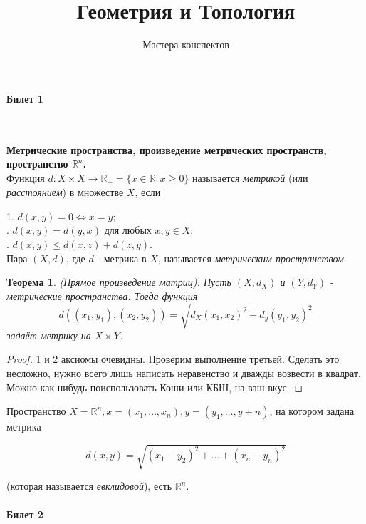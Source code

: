 \documentclass[a4paper,100pt]{article}
\title{Геометрия и Топология}
\author{Мастера конспектов}
\theoremstyle{indented}
\newtheorem{theorem}{Теорема}
\begin{document}
\maketitle 

\newpage

\paragraph{Билет 1} \

\medskip

\textbf{Метрические пространства, произведение метрических пространств, пространство $\mathbb{R}^n$.} \\

Функция $d: X \times X \rightarrow \mathbb{R}_+ = \{x \in \mathbb{R} : x\geq 0\}$ называется \textit{метрикой} (или \textit{расстоянием}) 
в множестве $X$, если \

\medskip

1. $d(x, y)=0 \Leftrightarrow x=y$; \\
. $d(x, y)= d(y, x)$ для любых $x, y \in X$; \\
. $d(x, y)\leq d(x, z)+d(z, y)$. \\

Пара $(X, d)$, где $d$ - метрика в $X$, называется \textit{метрическим пространством}. \\

\begin{theorem}
(Прямое произведение матриц). Пусть $(X, d_X)$ и $(Y, d_Y)$ - метрические пространства. Тогда функция
\[
    d((x_1, y_1), (x_2, y_2))=\sqrt{d_X(x_1, x_2)^2+d_y(y_1, y_2)^2}
\]
задаёт метрику на $X\times Y$.
\end{theorem}

\begin{proof}
1 и 2 аксиомы очевидны. Проверим выполнение третьей. Сделать это несложно, нужно всего лишь написать неравенство и дважды возвести в квадрат. Можно как-нибудь поиспользовать Коши или КБШ, на ваш вкус.
\end{proof}

\medskip

Пространство $X=\mathbb{R}^n, x=(x_1, \dots, x_n), y=(y_1, \dots, y+n)$, на котором задана метрика

\[
    d(x, y)=\sqrt{(x_1-y_2)^2+\dots+(x_n-y_n)^2}
\]


(которая называется \textit{евклидовой}), есть $\mathbb{R}^n$.

\paragraph{Билет 2} \
\end{document}
